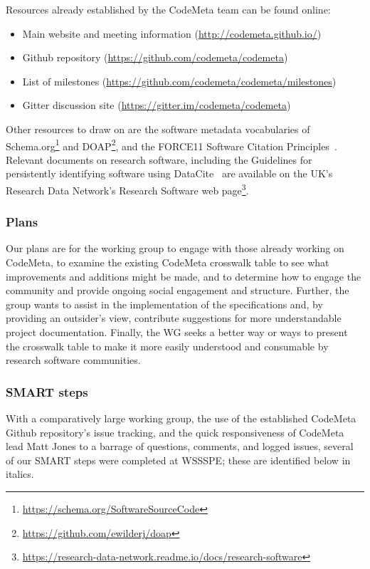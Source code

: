 Resources already established by the CodeMeta team can be found online:

\begin{itemize}
\item Main website and meeting information (\url{http://codemeta.github.io/})
\item Github repository (\url{https://github.com/codemeta/codemeta})
\item List of milestones (\url{https://github.com/codemeta/codemeta/milestones})
\item Gitter discussion site (\url{https://gitter.im/codemeta/codemeta})
\end {itemize}

Other resources to draw on are the software metadata vocabularies of Schema.org\footnote{\url{https://schema.org/SoftwareSourceCode}} and DOAP\footnote{\url{https://github.com/ewilderj/doap}}, and the FORCE11 Software Citation Principles~\cite{Smith:2016sc}. Relevant documents on research software, including the Guidelines for persistently identifying software using DataCite~\cite{Gent2015} are available on the UK's Research Data Network's Research Software web page\footnote{\url{https://research-data-network.readme.io/docs/research-software}}.

\subsubsection{Plans}

Our plans are for the working group to engage with those already working on CodeMeta, to examine the existing CodeMeta crosswalk table to see what improvements and additions might be made, and to determine how to engage the community and provide ongoing social engagement and structure. Further, the group wants to assist in the implementation of the specifications and, by providing an outsider's view, contribute suggestions for more understandable project documentation. Finally, the WG seeks a better way or ways to present the crosswalk table to make it more easily understood and consumable by research software communities.

\subsubsection{SMART steps}

With a comparatively large working group, the use of the established CodeMeta Github repository's issue tracking, and the quick responsiveness of CodeMeta lead Matt Jones to a barrage of questions, comments, and logged issues, several of our SMART steps were completed at WSSSPE; these are identified below in italics.

